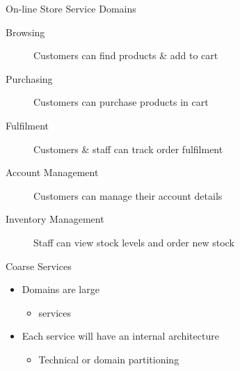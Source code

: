 \documentclass{slide}
\begin{document}
\begin{frame}{On-line Store Service Domains}
    \vspace{1mm}
    {\LARGE
    \begin{description}
        \item[Browsing] Customers can find products \& add to cart
        \item[Purchasing] Customers can purchase products in cart
        \item[Fulfilment] Customers \& staff can track order fulfilment
        \item[Account Management] Customers can manage their account details
        \item[Inventory Management] Staff can view stock levels and order new stock
    \end{description}
    }
\end{frame}


\begin{frame}{Coarse Services}
    \vspace{1mm}
    {\LARGE
    \begin{itemize}
        \item Domains are large
        \begin{itemize}
            \Large\item {} services
        \end{itemize}
        \vspace{2mm}
        \item Each service will have an internal architecture
        \begin{itemize}
            \Large\item Technical or domain partitioning
        \end{itemize}
    \end{itemize}
    }
\end{frame}
\end{document}
